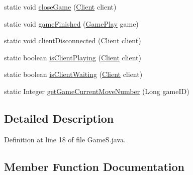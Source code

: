 \begin{DoxyCompactItemize}
\item 
static void \hyperlink{classpt_1_1up_1_1fe_1_1lpro1613_1_1server_1_1logic_1_1_game_s_a6d26b0fcc16136e701003a0c6b8f2960}{close\+Game} (\hyperlink{classpt_1_1up_1_1fe_1_1lpro1613_1_1server_1_1conn_1_1_client}{Client} client)
\item 
static void \hyperlink{classpt_1_1up_1_1fe_1_1lpro1613_1_1server_1_1logic_1_1_game_s_aa8bc8390e9b27b09516dc5edcfdc7981}{game\+Finished} (\hyperlink{classpt_1_1up_1_1fe_1_1lpro1613_1_1server_1_1logic_1_1game_1_1_game_play}{Game\+Play} game)
\item 
static void \hyperlink{classpt_1_1up_1_1fe_1_1lpro1613_1_1server_1_1logic_1_1_game_s_a094065fc706220db9e598e09c96a60c2}{client\+Disconnected} (\hyperlink{classpt_1_1up_1_1fe_1_1lpro1613_1_1server_1_1conn_1_1_client}{Client} client)
\item 
static boolean \hyperlink{classpt_1_1up_1_1fe_1_1lpro1613_1_1server_1_1logic_1_1_game_s_a51c1a3bbb8f87d4ce6c3658591440209}{is\+Client\+Playing} (\hyperlink{classpt_1_1up_1_1fe_1_1lpro1613_1_1server_1_1conn_1_1_client}{Client} client)
\item 
static boolean \hyperlink{classpt_1_1up_1_1fe_1_1lpro1613_1_1server_1_1logic_1_1_game_s_a12cbc3d6a25318c576d797b31f67ca16}{is\+Client\+Waiting} (\hyperlink{classpt_1_1up_1_1fe_1_1lpro1613_1_1server_1_1conn_1_1_client}{Client} client)
\item 
static Integer \hyperlink{classpt_1_1up_1_1fe_1_1lpro1613_1_1server_1_1logic_1_1_game_s_a7ba4f1f49645551b9b9537981b66e6e9}{get\+Game\+Current\+Move\+Number} (Long game\+ID)
\end{DoxyCompactItemize}


\subsection{Detailed Description}


Definition at line 18 of file Game\+S.\+java.



\subsection{Member Function Documentation}
\hypertarget{classpt_1_1up_1_1fe_1_1lpro1613_1_1server_1_1logic_1_1_game_s_ae7f86b6c54f2a043f3f08560fd4ee7b5}{}\label{classpt_1_1up_1_1fe_1_1lpro1613_1_1server_1_1logic_1_1_game_s_ae7f86b6c54f2a043f3f08560fd4ee7b5} 
